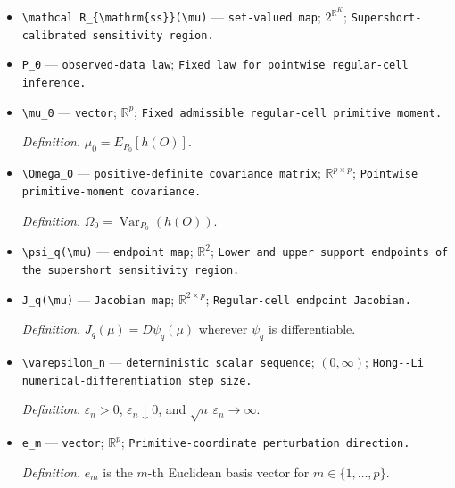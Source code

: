 \documentclass{article}
\begin{document}
\begin{itemize}
  \item \texttt{\textbackslash{}\allowbreak{}mathcal R\_\allowbreak{}\{\textbackslash{}\allowbreak{}mathrm\{ss\}\allowbreak{}\}\allowbreak{}(\textbackslash{}\allowbreak{}mu)} --- \texttt{set-\allowbreak{}valued map}; \(2^{\mathbb R^K}\); \texttt{Supershort-\allowbreak{}calibrated sensitivity region.}
  \item \texttt{P\_\allowbreak{}0} --- \texttt{observed-\allowbreak{}data law}; \texttt{Fixed law for pointwise regular-\allowbreak{}cell inference.}
  \item \texttt{\textbackslash{}\allowbreak{}mu\_\allowbreak{}0} --- \texttt{vector}; \(\mathbb R^p\); \texttt{Fixed admissible regular-\allowbreak{}cell primitive moment.}
  \par\smallskip\noindent\emph{Definition.} \(\mu_0=E_{P_0}[h(O)]\).
  \item \texttt{\textbackslash{}\allowbreak{}Omega\_\allowbreak{}0} --- \texttt{positive-\allowbreak{}definite covariance matrix}; \(\mathbb R^{p\times p}\); \texttt{Pointwise primitive-\allowbreak{}moment covariance.}
  \par\smallskip\noindent\emph{Definition.} \(\Omega_0=\operatorname{Var}_{P_0}(h(O))\).
  \item \texttt{\textbackslash{}\allowbreak{}psi\_\allowbreak{}q(\textbackslash{}\allowbreak{}mu)} --- \texttt{endpoint map}; \(\mathbb R^2\); \texttt{Lower and upper support endpoints of the supershort sensitivity region.}
  \item \texttt{J\_\allowbreak{}q(\textbackslash{}\allowbreak{}mu)} --- \texttt{Jacobian map}; \(\mathbb R^{2\times p}\); \texttt{Regular-\allowbreak{}cell endpoint Jacobian.}
  \par\smallskip\noindent\emph{Definition.} \(J_q(\mu)=D\psi_q(\mu)\) wherever \(\psi_q\) is differentiable.
  \item \texttt{\textbackslash{}\allowbreak{}varepsilon\_\allowbreak{}n} --- \texttt{deterministic scalar sequence}; \((0,\infty)\); \texttt{Hong-\allowbreak{}-\allowbreak{}Li numerical-\allowbreak{}differentiation step size.}
  \par\smallskip\noindent\emph{Definition.} \(\varepsilon_n>0\), \(\varepsilon_n\downarrow0\), and \(\sqrt n\,\varepsilon_n\to\infty\).
  \item \texttt{e\_\allowbreak{}m} --- \texttt{vector}; \(\mathbb R^p\); \texttt{Primitive-\allowbreak{}coordinate perturbation direction.}
  \par\smallskip\noindent\emph{Definition.} \(e_m\) is the \(m\)-th Euclidean basis vector for \(m\in\{1,\ldots,p\}\).

\end{itemize}
\end{document}
